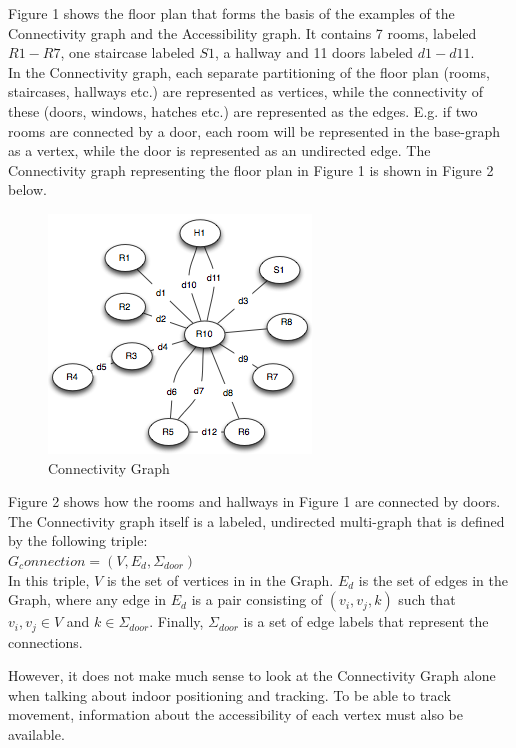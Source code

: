 Figure 1 shows the floor plan that forms the basis of the examples of the Connectivity graph and the Accessibility graph. 
It contains 7 rooms, labeled $R1 - R7$, one staircase labeled $S1$, a hallway and 11 doors labeled $d1-d11$. \\

In the Connectivity graph, each separate partitioning of the floor plan (rooms, staircases, hallways etc.) are represented as vertices, while the connectivity of these (doors, windows, hatches etc.) are represented as the edges.
E.g. if two rooms are connected by a door, each room will be represented in the base-graph as a vertex, while the door is represented as an undirected edge. 
The Connectivity graph representing the floor plan in Figure 1 is shown in Figure 2 below. 

\begin{figure}[H]%
\includegraphics{images/connectivitygraph.png}%
\caption{Connectivity Graph}%
\label{}%
\end{figure}%

Figure 2 shows how the rooms and hallways in Figure 1 are connected by doors. 
The Connectivity graph itself is a labeled, undirected multi-graph that is defined by the following triple: \\

$G_connection = (V, E_d, \Sigma_{door})$ \\

In this triple, $V$ is the set of vertices in in the Graph. 
$E_d$ is the set of edges in the Graph, where any edge in $E_d$ is a pair consisting of $({v_i, v_j}, k)$ such that $v_i, v_j \in V$ and $k \in \Sigma_{door}$.
Finally, $\Sigma_{door}$ is a set of edge labels that represent the connections. 

However, it does not make much sense to look at the Connectivity Graph alone when talking about indoor positioning and tracking. 
To be able to track movement, information about the accessibility of each vertex must also be available. 

